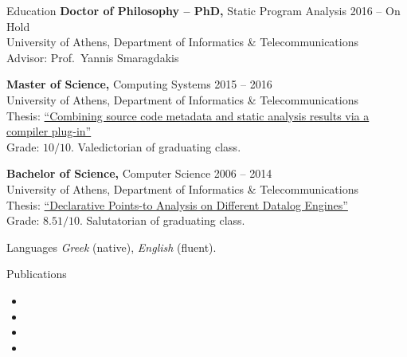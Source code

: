 \documentclass{resume}
\begin{document}

\begin{rSection}{Education}
  {\bf Doctor of Philosophy -- PhD,} Static Program Analysis \hfill {2016 -- On Hold } \\
  University of Athens,  Department of Informatics \& Telecommunications \\
  Advisor: Prof.~Yannis Smaragdakis

  {\bf Master of Science,} Computing Systems \hfill {2015 -- 2016 } \\
  University of Athens,  Department of Informatics \& Telecommunications \\
  Thesis: \href{http://cgi.di.uoa.gr/~smaragd/theses/antoniadis2.pdf}{``Combining source code metadata and static analysis results via a compiler plug-in''} \\
  Grade: $10 / 10$. Valedictorian of graduating class.

  {\bf Bachelor of Science,}  Computer Science \hfill {2006 -- 2014}  \\
  University of Athens,  Department of Informatics \& Telecommunications \\
  Thesis: \href{http://cgi.di.uoa.gr/~smaragd/theses/antoniadis.pdf}{``Declarative Points-to Analysis on Different Datalog Engines''} \\
  Grade: $8.51 / 10$. Salutatorian of graduating class.
\end{rSection}

\begin{rSection}{Languages}
  \textit{Greek} (native), \textit{English} (fluent).
\end{rSection}

\begin{rSection}{Publications}
    \begin{itemize}[label={}, leftmargin=*, topsep=0.1pt]
      \setlength\itemsep{+0.5em}
        \item {}
        \item {}
        \item {}
        \item {}
    \end{itemize}
\end{rSection}
\end{document}

